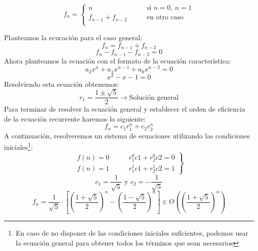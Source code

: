 \documentclass[10pt,a4paper,spanish]{report}
\theoremstyle{definition}
\theoremstyle{remark}
\begin{document}
\begin{displaymath}
    f_n = \left\{ \begin{array}{ll}
n & \qquad \textrm{si $n = 0$, $n = 1$}\\
f_{n-1} + f_{n-2} & \qquad \textrm{en otro caso} \\
\end{array} \right.
\end{displaymath}

\begin{center}
    Planteamos la ecucación para el caso general:
    \begin{displaymath}
        f_n = f_{n-1} + f_{n-2}
    \end{displaymath}
    \begin{displaymath}
        f_n - f_{n-1} - f_{n-2} = 0
    \end{displaymath}
    Ahora planteamos la ecuación con el formato de la ecuación característica:
    \begin{displaymath}
        a_2x^n + a_1x^{n-1}+a_0x^{n-2} = 0
    \end{displaymath}
    \begin{displaymath}
        x^2 - x - 1 = 0
    \end{displaymath}
    Resolviendo esta ecuación obtenemos:
    \begin{displaymath}
        r_1 = \frac{1 \pm \sqrt{5}}{2} \rightarrow \text{Solución general}
    \end{displaymath}
    Para terminar de resolver la ecuación general y establecer el orden de eficiencia de la ecuación recurrente haremos lo siguiente:
    \begin{displaymath}
        f_n = c_1r_1^n + c_2r_2^n
    \end{displaymath}
    A continuación, resolveremos un sistema de ecuaciones utilizando las condiciones iniciales\footnote{En caso de no disponer de las condiciones iniciales suficientes, podemos usar la ecuación general para obtener todos los términos que sean necesarios}:
    \begin{displaymath}
        \left . \begin{array}{ll}
        f(n) = 0 & \qquad r_1^0c1 + r_2^0c2 = 0 \\
        f(n) = 1 & \qquad r_1^1c1 + r_2^1c2 = 1
        \end{array} \right \}
    \end{displaymath}
    \begin{displaymath}
        c_1 = \frac{1}{\sqrt{5}} \text{ y } c_2 = -\frac{1}{\sqrt{5}}
    \end{displaymath}
    \begin{displaymath}
        f_n = \frac{1}{\sqrt{5}}\cdot\left[ \left(\frac{1+\sqrt{5}}{2}\right)^n - \left(\frac{1-\sqrt{5}}{2}\right)^n\right] \in O\left(\left(\frac{1+\sqrt{5}}{2}\right)^n\right)
    \end{displaymath}
\end{center}
\end{document}
